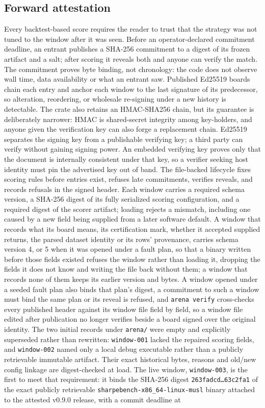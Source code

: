 \subsection{Forward attestation}\label{sec:attest} Every backtest-based score requires the reader to trust that the strategy was not tuned to the window after it was seen. Before an operator-declared commitment deadline, an entrant publishes a SHA-256 commitment to a digest of its frozen artifact and a salt; after scoring it reveals both and anyone can verify the match. The commitment proves byte binding, not chronology: the code does not observe wall time, data availability or what an entrant saw. Published Ed25519 boards chain each entry and anchor each window to the last signature of its predecessor, so alteration, reordering, or wholesale re-signing under a new history is detectable. The crate also retains an HMAC-SHA256 chain, but its guarantee is deliberately narrower: HMAC is shared-secret integrity among key-holders, and anyone given the verification key can also forge a replacement chain. Ed25519 separates the signing key from a publishable verifying key; a third party can verify without gaining signing power. An embedded verifying key proves only that the document is internally consistent under that key, so a verifier seeking host identity must pin the advertised key out of band. The file-backed lifecycle fixes scoring rules before entries exist, refuses late commitments, verifies reveals, and records refusals in the signed header. Each window carries a required schema version, a SHA-256 digest of its fully serialized scoring configuration, and a required digest of the scorer artifact; loading rejects a mismatch, including one caused by a new field being supplied from a later software default. A window that records what its board means, its certification mark, whether it accepted supplied returns, the parsed dataset identity or its rows' provenance, carries schema version 4, or 5 when it was opened under a fault plan, so that a binary written before those fields existed refuses the window rather than loading it, dropping the fields it does not know and writing the file back without them; a window that records none of them keeps its earlier version and bytes. A window opened under a seeded fault plan also binds that plan's digest, a commitment to such a window must bind the same plan or its reveal is refused, and \texttt{arena verify} cross-checks every published header against its window file field by field, so a window file edited after publication no longer verifies beside a board signed over the original identity. The two initial records under \texttt{arena/} were empty and explicitly superseded rather than rewritten: \texttt{window-001} lacked the repaired scoring fields, and \texttt{window-002} named only a local debug executable rather than a publicly retrievable immutable artifact. Their exact historical bytes, reasons and old/new config linkage are digest-checked at load. The live window, \texttt{window-003}, is the first to meet that requirement: it binds the SHA-256 digest \texttt{263fadcd\ldots63c2fa1} of the exact publicly retrievable \texttt{sharpebench-x86\_64-linux-musl} binary attached to the attested v0.9.0 release, with a commit deadline at 